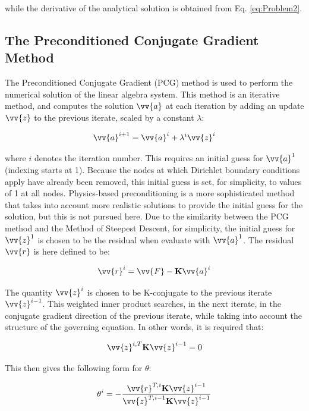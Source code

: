 \documentclass[10pt]{article}
\begin{document}
while the derivative of the analytical solution is obtained from Eq. \eqref{eq:Problem2}. 

\subsection{The Preconditioned Conjugate Gradient Method}

The Preconditioned Conjugate Gradient (PCG) method is used to perform the numerical solution of the linear algebra system. This method is an iterative method, and computes the solution \(\vv{a}\) at each iteration by adding an update \(\vv{z}\) to the previous iterate, scaled by a constant \(\lambda\):

\begin{equation}
\label{eq:PCGUpdate}
\vv{a}^{i+1}=\vv{a}^i+\lambda^i\vv{z}^i
\end{equation}

where \(i\) denotes the iteration number. This requires an initial guess for \(\vv{a}^1\) (indexing starts at 1). Because the nodes at which Dirichlet boundary conditions apply have already been removed, this initial guess is set, for simplicity, to values of 1 at all nodes. Physics-based preconditioning is a more sophisticated method that takes into account more realistic solutions to provide the initial guess for the solution, but this is not pursued here. Due to the similarity between the PCG method and the Method of Steepest Descent, for simplicity, the initial guess for \(\vv{z}^1\) is chosen to be the residual when evaluate with \(\vv{a}^1\). The residual \(\vv{r}\) is here defined to be:

\begin{equation}
\vv{r}^i=\vv{F}-\textbf{K}\vv{a}^i
\end{equation}

The quantity \(\vv{z}^i\) is chosen to be K-conjugate to the previous iterate \(\vv{z}^{i-1}\). This weighted inner product searches, in the next iterate, in the conjugate gradient direction of the previous iterate, while taking into account the structure of the governing equation. In other words, it is required that:

\begin{equation}
\vv{z}^{i,T}\textbf{K}\vv{z}^{i-1}=0
\end{equation}

This then gives the following form for \(\theta\):

\begin{equation}
\theta^i=-\frac{\vv{r}^{T,i}\textbf{K}\vv{z}^{i-1}}{\vv{z}^{T,i-1}\textbf{K}\vv{z}^{i-1}}
\end{equation}
\end{document}
